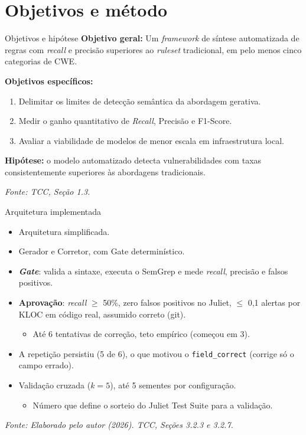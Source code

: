 \documentclass[
    aspectratio=169,
    12pt,
    brazil
]{beamer}
\newcommand{\fonte}[1]{{\tiny\itshape Fonte: #1\par}}
\begin{document}
\section{Objetivos e método}
\begin{frame}{Objetivos e hipótese}
  \textbf{Objetivo geral:} Um \textit{framework} de síntese automatizada de regras com \textit{recall} e precisão superiores ao \textit{ruleset} tradicional, em pelo menos cinco categorias de CWE.
  \vspace{0.2cm}

  \textbf{Objetivos específicos:}
  \begin{enumerate}
    \item Delimitar os limites de detecção semântica da abordagem gerativa.
    \item Medir o ganho quantitativo de \textit{Recall}, Precisão e F1-Score.
    \item Avaliar a viabilidade de modelos de menor escala em infraestrutura local.
  \end{enumerate}
  \vspace{0.2cm}

  \textbf{Hipótese:} o modelo automatizado detecta vulnerabilidades com taxas consistentemente superiores às abordagens tradicionais.
  \vfill
  \fonte{TCC, Seção 1.3.}
\end{frame}

\begin{frame}{Arquitetura implementada}
  \begin{itemize}
    \item Arquitetura simplificada.
    \item Gerador e Corretor, com Gate determinístico.
    \item \textbf{\textit{Gate}}: valida a sintaxe, executa o SemGrep e mede \textit{recall}, precisão e falsos positivos.
    \item \textbf{Aprovação}: \textit{recall} $\geq$ 50\%, zero falsos positivos no Juliet, $\leq$ 0,1 alertas por KLOC em código real, assumido correto (git).
    \begin{itemize}
      \item Até 6 tentativas de correção, teto empírico (começou em 3).
    \end{itemize}
    \item A repetição persistiu (5 de 6), o que motivou o \texttt{field\_correct} (corrige só o campo errado).
    \item Validação cruzada ($k=5$), até 5 sementes por configuração.
    \begin{itemize}
      \item Número que define o sorteio do Juliet Test Suite para a validação.
    \end{itemize}
  \end{itemize}
  \vfill
  \fonte{Elaborado pelo autor (2026). TCC, Seções 3.2.3 e 3.2.7.}
\end{frame}
\end{document}
